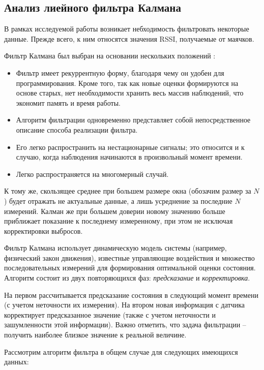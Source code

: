 \subsection{Анализ лиейного фильтра Калмана}

В рамках исследуемой работы возникает небходимость фильтровать некоторые данные. Прежде всего, к ним относятся значения RSSI, получаемые от маячков.

Фильтр Калмана был выбран на основании нескольких положений \cite{eikhoff}:

\begin{itemize}
    \item
    Фильтр имеет рекуррентную форму, благодаря чему он удобен для программирования. Кроме того, так как новые оценки формируются на основе старых, нет необходимости хранить весь массив наблюдений, что экономит память и время работы.
    \item
    Алгоритм фильтрации одновременно представляет собой непосредственное описание способа реализации фильтра.
    \item    
    Его легко распространить на нестационарные сигналы; это относится и к случаю, когда наблюдения начинаются в произвольный момент времени.
    \item
    Легко распространяется на многомерный случай.
\end{itemize}

К тому же, скользящее среднее при большем размере окна (обозачим размер за $N$) будет отражать не актуальные данные, а лишь усреднение за последние $N$ измерений. Калман же при большем доверии новому значению больше приближает показание к последнему измеренному, при этом не исключая корректировки выбросов.

Фильтр Калмана использует динамическую модель системы (например, физический закон движения), известные управляющие воздействия и множество последовательных измерений для формирования оптимальной оценки состояния. Алгоритм состоит из двух повторяющихся фаз: \textit{предсказание} и \textit{корректировка}. 

На первом рассчитывается предсказание состояния в следующий момент времени (с учетом неточности их измерения). На втором новая информация с датчика корректирует предсказанное значение (также с учетом неточности и зашумленности этой информации). Важно отметить, что задача фильтрации – получить наиболее близкое значение к реальной величине.

Рассмотрим алгоритм фильтра в общем случае для следующих имеющихся данных: 


